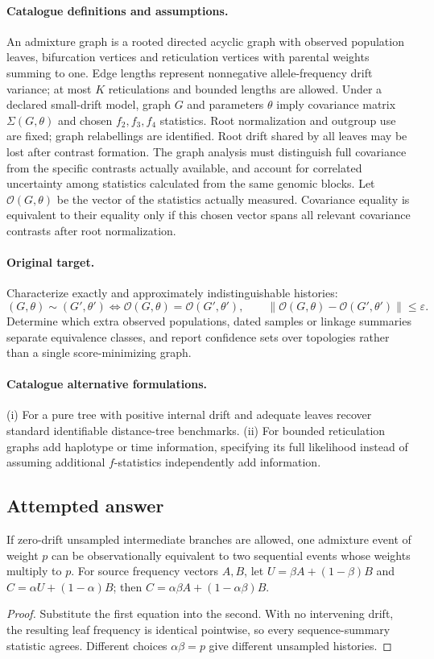 \documentclass[11pt]{article}
\begin{document}
\paragraph{Catalogue definitions and assumptions.}
An admixture graph is a rooted directed acyclic graph with observed population leaves, bifurcation vertices and reticulation vertices with parental weights summing to one. Edge lengths represent nonnegative allele-frequency drift variance; at most $K$ reticulations and bounded lengths are allowed. Under a declared small-drift model, graph $G$ and parameters $\theta$ imply covariance matrix $\Sigma(G,\theta)$ and chosen $f_2,f_3,f_4$ statistics. Root normalization and outgroup use are fixed; graph relabellings are identified. Root drift shared by all leaves may be lost after contrast formation. The graph analysis must distinguish full covariance from the specific contrasts actually available, and account for correlated uncertainty among statistics calculated from the same genomic blocks. Let $\mathcal O(G,\theta)$ be the vector of the statistics actually measured. Covariance equality is equivalent to their equality only if this chosen vector spans all relevant covariance contrasts after root normalization.
\paragraph{Original target.}
Characterize exactly and approximately indistinguishable histories:
\[
 (G,\theta)\sim(G',\theta')
 \iff\mathcal O(G,\theta)=\mathcal O(G',\theta'),
 \qquad
 \|\mathcal O(G,\theta)-\mathcal O(G',\theta')\|\le\varepsilon.
\]
Determine which extra observed populations, dated samples or linkage summaries separate equivalence classes, and report confidence sets over topologies rather than a single score-minimizing graph.
\paragraph{Catalogue alternative formulations.}
(i) For a pure tree with positive internal drift and adequate leaves recover standard identifiable distance-tree benchmarks. (ii) For bounded reticulation graphs add haplotype or time information, specifying its full likelihood instead of assuming additional $f$-statistics independently add information.
\subsection{Attempted answer}
\begin{proposition}
If zero-drift unsampled intermediate branches are allowed, one admixture event of weight $p$ can be observationally equivalent to two sequential events whose weights multiply to $p$. For source frequency vectors $A,B$, let $U=\beta A+(1-\beta)B$ and $C=\alpha U+(1-\alpha)B$; then $C=\alpha\beta A+(1-\alpha\beta)B$.
\end{proposition}
\begin{proof}
Substitute the first equation into the second. With no intervening drift, the resulting leaf frequency is identical pointwise, so every sequence-summary statistic agrees. Different choices $\alpha\beta=p$ give different unsampled histories.
\end{proof}
\end{document}
